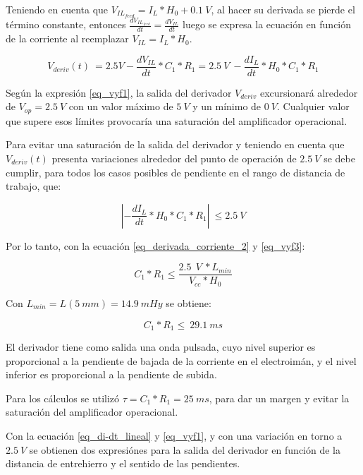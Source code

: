 Teniendo en cuenta que $V_{IL_{feed}}=I_L*H_0+0.1\:V$, al hacer su derivada se pierde el término constante, entonces $ \frac{dV_{IL_{feed}}}{dt}= \frac{dV_{IL}}{dt}$ luego se expresa la ecuación en función de la corriente al reemplazar $V_{IL}=I_L*H_0$.

\begin{equation} \label{eq_vyf1}
	V_{deriv}(t)\ = 2.5V - \frac{dV_{IL}}{dt}*C_1*R_1 = 2.5\:V\ -\frac{dI_L}{dt}*H_0*C_1*R_1
\end{equation}

Según la expresión \ref{eq_vyf1}, la salida del derivador $V_{deriv}$ excursionará alrededor de $V_{op}=2.5\:V$ con un valor máximo de $5\:V$ y un mínimo de $0\:V$. Cualquier valor que supere esos límites provocaría una saturación del amplificador operacional.

Para evitar una saturación de la salida del derivador y teniendo en cuenta que $V_{deriv}(t)$ presenta variaciones alrededor del punto de operación de $2.5\:V$ se debe cumplir, para todos los casos posibles de pendiente en el rango de distancia de trabajo, que:

\begin{equation} \label{eq_vyf3}
	\left|-\frac{dI_L}{dt}*H_0*C_1*R_1\right|\ \le 2.5\:V
\end{equation}

Por lo tanto, con la ecuación \ref{eq_derivada_corriente_2} y \ref{eq_vyf3}:

\begin{equation} \label{eq_condicionC1-R1}
	C_1*R_1\le\frac{2.5\ \:V\ *L_{min}}{V_{cc}*H_0}
\end{equation}

Con $L_{min}= L(5\: mm) = 14.9\: mHy$ se obtiene: 

\begin{equation} \label{eq_condicionC1-R1-2}
	C_1*R_1\le\ 29.1\ ms
\end{equation}

El derivador tiene como salida una onda pulsada, cuyo nivel superior es proporcional a la pendiente de bajada de la corriente en el electroimán, y el nivel inferior es proporcional a la pendiente de subida.

Para los cálculos se utilizó $\tau = C_1*R_1= 25\:ms$, para dar un margen y evitar la saturación del amplificador operacional.  

Con la ecuación \ref{eq_di-dt_lineal} y \ref{eq_vyf1}, y con una variación en torno a $2.5\:V$ se obtienen dos expresiónes para la salida del derivador en función de la distancia de entrehierro y el sentido de las pendientes.


